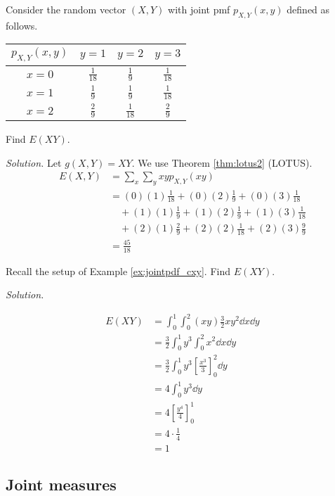 \begin{example}[]
	Consider the random vector $(X,Y)$ with joint pmf $p_{X,Y}(x,y)$ defined as follows.

	\begin{center}
	\begin{tabular}{c | c c c}
		$p_{X,Y}(x,y)$ & $y=1$ & $y=2$ & $y=3$\\ \hline
		$x=0$ & $\frac{1}{18}$ & $\frac{1}{9}$ & $\frac{1}{18}$\\
		$x=1$ & $\frac{1}{9}$ & $\frac{1}{9}$ & $\frac{1}{18}$\\
		$x=2$ & $\frac{2}{9}$ & $\frac{1}{18}$ & $\frac{2}{9}$
	\end{tabular}
	\end{center}

	Find $E(XY)$.

	\textit{Solution.} Let $g(X,Y)=XY$. We use Theorem \ref{thm:lotus2} (LOTUS).
	\begin{align*}
		E(X,Y)&=\sum_{x}\sum_{y}xyp_{X,Y}(xy)\\
		&=(0)(1)\frac{1}{18}+(0)(2)\frac{1}{9}+(0)(3)\frac{1}{18}\\
		&\quad +(1)(1)\frac{1}{9}+(1)(2)\frac{1}{9}+(1)(3)\frac{1}{18}\\
		&\quad +(2)(1)\frac{2}{9}+(2)(2)\frac{1}{18}+(2)(3)\frac{9}{9}\\
		&=\frac{45}{18}
	\end{align*}
\end{example}

\begin{example}[]\label{ex:jointpdf_E(XY)}
	Recall the setup of Example \ref{ex:jointpdf_cxy}. Find $E(XY)$.

	\textit{Solution.}

	\begin{align*}
		E(XY)&=\int_0^1\int_0^2(xy)\frac 32xy^2\dd x\dd y\\
		&=\frac 32\int_0^1y^3\int_0^2x^2\dd x\dd y\\
		&=\frac 32\int_0^1y^3\left[\frac{x^3}3\right]_0^2\dd y\\
		&=4\int_0^1y^3\dd y\\
		&=4\left[\frac{y^4}{4}\right]_0^1\\
		&=4\cdot\frac 14\\
		&=1
	\end{align*}
\end{example}

\subsection{Joint measures}

